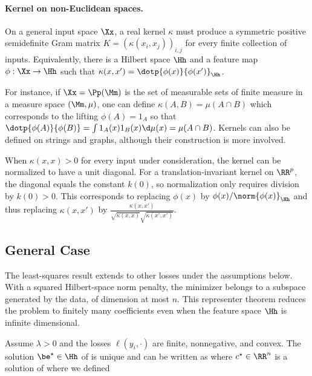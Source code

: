 \paragraph{Kernel on non-Euclidean spaces.}

On a general input space $\Xx$, a real kernel $\kappa$ must produce a symmetric positive semidefinite Gram matrix $K=(\kappa(x_i,x_j))_{i,j}$ for every finite collection of inputs. Equivalently, there is a Hilbert space $\Hh$ and a feature map $\phi:\Xx \rightarrow \Hh$ such that $\kappa(x,x')=\dotp{\phi(x)}{\phi(x')}_\Hh$.

For instance, if $\Xx = \Pp(\Mm)$ is the set of measurable sets of finite measure in a measure space $(\Mm,\mu)$, one can define $\kappa(A,B) = \mu(A \cap B)$ which corresponds to the lifting $\phi(A)=1_A$ so that $\dotp{\phi(A)}{\phi(B)} = \int 1_A(x) 1_B(x)\d \mu(x) = \mu(A \cap B)$.
%
Kernels can also be defined on strings and graphs, although their construction is more involved.

When $\kappa(x,x)>0$ for every input under consideration, the kernel can be normalized to have a unit diagonal. For a translation-invariant kernel on $\RR^p$, the diagonal equals the constant $k(0)$, so normalization only requires division by $k(0)>0$. This corresponds to replacing $\phi(x)$ by $\phi(x)/\norm{\phi(x)}_\Hh$ and thus replacing $\kappa(x,x')$ by $\frac{\kappa(x,x')}{\sqrt{\kappa(x,x)}\sqrt{\kappa(x',x')}}$.



\subsection{General Case}

The least-squares result extends to other losses under the assumptions below. With a squared Hilbert-space norm penalty, the minimizer belongs to a subspace generated by the data, of dimension at most $n$. This representer theorem reduces the problem to finitely many coefficients even when the feature space $\Hh$ is infinite dimensional.

\begin{prop}
	Assume $\lambda>0$ and the losses $\ell(y_i,\cdot)$ are finite, nonnegative, and convex. The solution $\be^\star\in\Hh$ of
	is unique and can be written as
	where $c^\star\in\RR^n$ is a solution of
	where we defined 
\end{prop}


